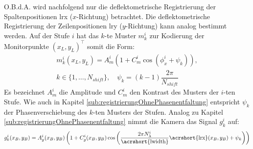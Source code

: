 \p
O.B.d.A. wird nachfolgend nur die deflektometrische Registrierung der Spaltenpositionen \acrshort{lrx} ($x$-Richtung) betrachtet.
Die deflektometrische Registrierung der Zeilenpositionen \acrshort{lry} ($y$-Richtung) kann analog bestimmt werden.
Auf der Stufe $i$ hat das $k$-te Muster $m_k^i$ zur Kodierung der Monitorpunkte $(x_L, y_L)^\top$ somit die Form:
%
\begin{equation}\label{eq:monitormuster_mehrstufig}
	\begin{gathered}	
		m_k^i(x_L,y_L) = A_m^i \left(1 + C_m^i \cos \left(\phi_x^i + \psi_k\right)\right),\\
		k \in \lbrace 1,\ldots,N_{shift}\rbrace,
		\quad
		\psi_k = (k - 1)\dfrac{2\pi}{N_{shift}}
	\end{gathered}
\end{equation}
%
Es bezeichnet $A_m^i$ die Amplitude und $C_m^i$ den Kontrast des Musters der $i$-ten Stufe.
Wie auch in Kapitel \ref{sub:registrierungOhnePhasenentfaltung} entspricht $\psi_k$ der Phasenverschiebung des $k$-ten Musters der Stufen.
Analog zu Kapitel \ref{sub:registrierungOhnePhasenentfaltung} nimmt die Kamera das Signal $g_k^i$ auf:
%
\begin{equation}\label{eq:kamerabild}
	g_k^i(x_B, y_B) = A_g^i(x_B, y_B) \left(1 + C_g^i(x_B, y_B) \cos \left(\dfrac{2\pi N_\lambda^i}{\text{\acrshort{lwidth}}}\text{\acrshort{lrx}}(x_B, y_B) + \psi_k\right)\right)
\end{equation}